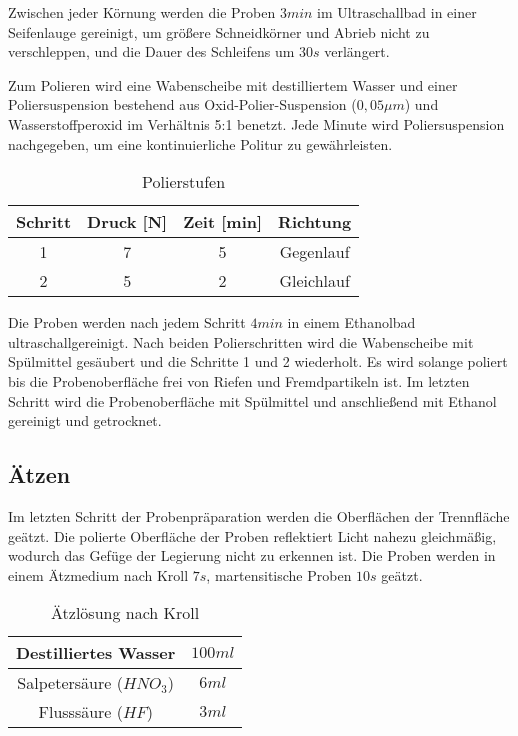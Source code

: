 Zwischen jeder Körnung werden die Proben $3 min$ im Ultraschallbad in einer Seifenlauge gereinigt, um größere Schneidkörner und Abrieb nicht zu verschleppen, und die Dauer des Schleifens um $30 s$ verlängert. 

Zum Polieren wird eine Wabenscheibe mit destilliertem Wasser und einer Poliersuspension bestehend aus Oxid-Polier-Suspension ($0,05 \mu m$) und Wasserstoffperoxid im Verhältnis 5:1 benetzt. Jede Minute wird Poliersuspension nachgegeben, um eine kontinuierliche Politur zu gewährleisten.

\begin{table}[h]
	\centering
	
	\begin{tabular}{|c|c|c|c|}
		\hline 
		Schritt & Druck [N] & Zeit [min] & Richtung \\ 
		\hline 
		1 & 7 & 5 & Gegenlauf \\ 
		\hline 
		2 & 5 & 2 & Gleichlauf \\ 
		\hline 
	\end{tabular} 
	\caption{Polierstufen}
	\label{tab:Polierstufen}
\end{table}

Die Proben werden nach jedem Schritt $4 min$ in einem Ethanolbad ultraschallgereinigt. Nach beiden Polierschritten wird die Wabenscheibe mit Spülmittel gesäubert und die Schritte 1 und 2 wiederholt. Es wird solange poliert bis die Probenoberfläche frei von Riefen und Fremdpartikeln ist. Im letzten Schritt wird die Probenoberfläche mit Spülmittel und anschließend mit Ethanol gereinigt und getrocknet. 


\subsection{Ätzen}

Im letzten Schritt der Probenpräparation werden die Oberflächen der Trennfläche geätzt. Die polierte Oberfläche der Proben reflektiert Licht nahezu gleichmäßig, wodurch das Gefüge der Legierung nicht zu erkennen ist. 
Die Proben werden in einem Ätzmedium nach Kroll $7s$, martensitische Proben $10s$ geätzt. 

\begin{table}[h]
	\centering
	\begin{tabular}{|c|c|}
		
		\hline 
		Destilliertes Wasser
		& $100ml$
		\\ 
		\hline 
		Salpetersäure ($HNO_{3}$)	& $6ml$
		\\ 
		\hline 
		Flusssäure ($HF$) & $3ml$
		\\ 
		\hline 
	\end{tabular} 
	\caption{Ätzlösung nach Kroll}
	\label{tab:Ätz_Kroll}
\end{table}



